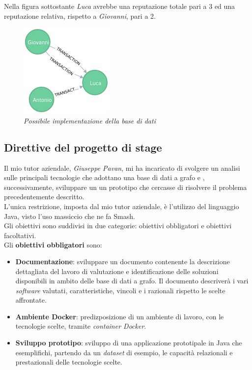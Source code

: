 Nella figura sottostante \textit{Luca} avrebbe una reputazione totale pari a 3 ed una reputazione relativa, rispetto a \textit{Giovanni}, pari a 2.
\begin{figure}[h!]
	\centering
	\includegraphics[scale=0.8]{immagini/grafo1.png}
	\caption{\textit{Possibile implementazione della base di dati}}
\end{figure}
\subsection{Direttive del progetto di stage}
Il mio tutor aziendale, \textit{Giuseppe Pavan}, mi ha incaricato di svolgere un analisi sulle principali tecnologie che adottano una base di dati a grafo e , successivamente, sviluppare un un prototipo che cercasse di risolvere il problema precedentemente descritto.\\
L'unica restrizione, imposta dal mio tutor aziendale, è l'utilizzo del linguaggio Java, visto l'uso massiccio che ne fa Smash\textregistered.\\
Gli obiettivi sono suddivisi in due categorie: obiettivi obbligatori e obiettivi facoltativi.\\
Gli \textbf{obiettivi obbligatori} sono:
\begin{itemize}
\item{\textbf{Documentazione}:} sviluppare un documento contenente la descrizione dettagliata del lavoro di valutazione e identificazione delle soluzioni disponibili in ambito delle base di dati a grafo. Il documento descriverà i vari \textit{software} valutati, caratteristiche, vincoli e i razionali rispetto le scelte affrontate.
\item{\textbf{Ambiente Docker\glsfirstoccur}:} predizposizione di un ambiente di lavoro, con le tecnologie scelte, tramite \textit{container Docker}.
\item{\textbf{Sviluppo prototipo}:} sviluppo di una applicazione prototipale in Java che esemplifichi, partendo da un \textit{dataset} di esempio, le capacità relazionali e prestazionali delle tecnologie scelte.
\end{itemize}

